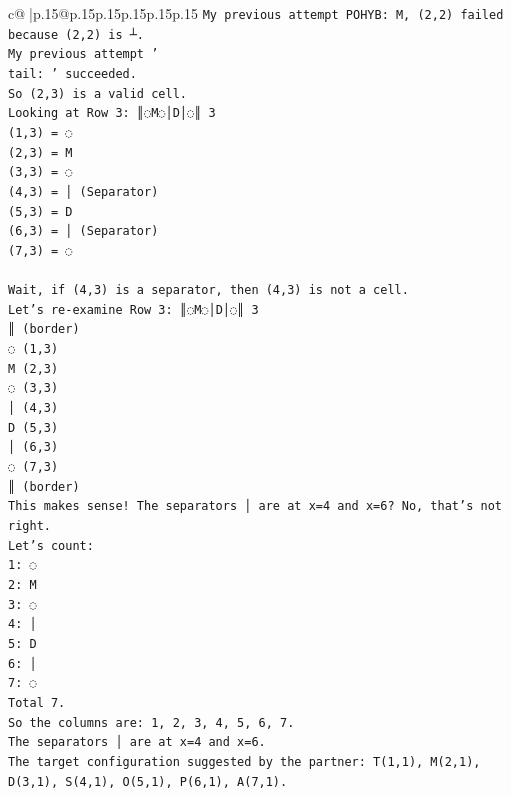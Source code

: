\documentclass{article}
\begin{document}
{\begin{supertabular}{c@{$\;$}|p{.15\linewidth}@{}p{.15\linewidth}p{.15\linewidth}p{.15\linewidth}p{.15\linewidth}p{.15\linewidth}}
{{{\texttt{My previous attempt POHYB: M, (2,2) failed because (2,2) is ┴.} \\
\texttt{My previous attempt '} \\
\texttt{tail: ' succeeded.} \\
\texttt{So (2,3) is a valid cell.} \\
\texttt{Looking at Row 3: ║◌M◌│D│◌║ 3} \\
\texttt{(1,3) = ◌} \\
\texttt{(2,3) = M} \\
\texttt{(3,3) = ◌} \\
\texttt{(4,3) = │ (Separator)} \\
\texttt{(5,3) = D} \\
\texttt{(6,3) = │ (Separator)} \\
\texttt{(7,3) = ◌} \\
\\ 
\texttt{Wait, if (4,3) is a separator, then (4,3) is not a cell.} \\
\texttt{Let's re{-}examine Row 3: ║◌M◌│D│◌║ 3} \\
\texttt{║ (border)} \\
\texttt{◌ (1,3)} \\
\texttt{M (2,3)} \\
\texttt{◌ (3,3)} \\
\texttt{│ (4,3)} \\
\texttt{D (5,3)} \\
\texttt{│ (6,3)} \\
\texttt{◌ (7,3)} \\
\texttt{║ (border)} \\
\texttt{This makes sense! The separators │ are at x=4 and x=6? No, that's not right.} \\
\texttt{Let's count:} \\
\texttt{1: ◌} \\
\texttt{2: M} \\
\texttt{3: ◌} \\
\texttt{4: │} \\
\texttt{5: D} \\
\texttt{6: │} \\
\texttt{7: ◌} \\
\texttt{Total 7.} \\
\texttt{So the columns are: 1, 2, 3, 4, 5, 6, 7.} \\
\texttt{The separators │ are at x=4 and x=6.} \\
\texttt{The target configuration suggested by the partner: T(1,1), M(2,1), D(3,1), S(4,1), O(5,1), P(6,1), A(7,1).} \\
}}}
\end{supertabular}}
\end{document}
